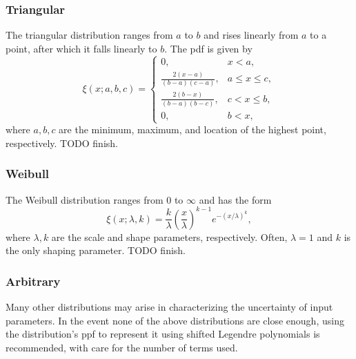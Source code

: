 \subsubsection{Triangular}
The triangular distribution ranges from $a$ to $b$ and rises linearly from $a$ to a point, after which it falls linearly to $b$.  The pdf is given by
\begin{equation}
\xi(x;a,b,c)=\begin{cases}
0, & x<a,\\
\frac{2(x-a)}{(b-a)(c-a)}, & a\leq x \leq c,\\
\frac{2(b-x)}{(b-a)(b-c)}, & c<x\leq b,\\
0, & b<x,
\end{cases}
\end{equation}
where $a,b,c$ are the minimum, maximum, and location of the highest point, respectively. TODO finish.

\subsubsection{Weibull}
The Weibull distribution ranges from 0 to $\infty$ and has the form
\begin{equation}
\xi(x;\lambda,k)=\frac{k}{\lambda}\left(\frac{x}{\lambda}\right)^{k-1}e^{-(x/\lambda)^k},
\end{equation}
where $\lambda,k$ are the scale and shape parameters, respectively.  Often, $\lambda=1$ and $k$ is the only shaping parameter. TODO finish.

\subsubsection{Arbitrary}
Many other distributions may arise in characterizing the uncertainty of input parameters.  In the event none of the above distributions are close enough, using the distribution's ppf to represent it using shifted Legendre polynomials is recommended, with care for the number of terms used.